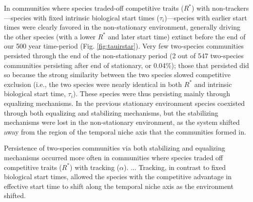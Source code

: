 \documentclass[11pt,letterpaper]{article}
\begin{document}
In communities where species traded-off competitive traits ($R^*$) with non-trackers---species with fixed intrinsic biological start times ($\tau_i$)---species with earlier start times were clearly favored in the non-stationary environment, generally driving the other species (with a lower $R^*$ and later start time) extinct before the end of our 500 year time-period (Fig. \ref{fig:tauirstar}). Very few two-species communities persisted through the end of the non-stationary period (2 out of 547 two-species communities persisting after end of stationary, or 0.04\%); those that persisted did so because the strong similarity between the two species slowed competitive exclusion (i.e., the two species were nearly identical in both $R^*$ and intrinsic biological start time, $\tau_i$). These species were thus persisting mainly through equalizing mechanisms. In the previous stationary environment species coexisted through both equalizing and stabilizing mechanisms, but the stabilizing mechanisms were lost in the non-stationary environment, as the system shifted away from the region of the temporal niche axis that the communities formed in. 

Persistence of two-species communities via both stabilizing and equalizing mechanisms occurred more often in communities where species traded off competitive traits ($R^*$) with tracking ($\alpha$). 
...
Tracking, in contrast to fixed biological start times, allowed the species with the competitive advantage in effective start time to shift along the temporal niche axis as the environment shifted.  
\end{document}
